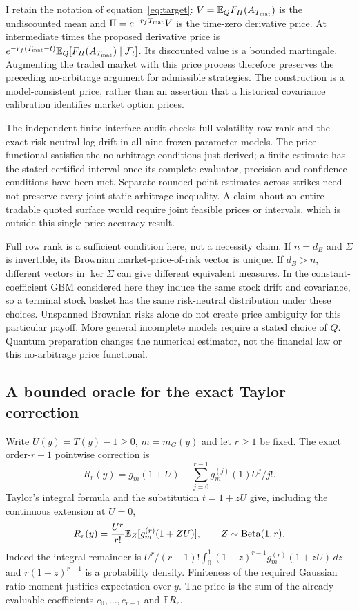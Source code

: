 I retain the notation of equation~\eqref{eq:target}:
$V=\mathbb E_Q F_H(A_{T_{\rm mat}})$ is the undiscounted mean and
$\Pi=e^{-r_fT_{\rm mat}}V$ is the time-zero derivative price.
At intermediate times the proposed derivative price is
$e^{-r_f(T_{\rm mat}-t)}\mathbb E_Q[F_H(A_{T_{\rm mat}})\mid\mathcal F_t]$.
Its discounted value is a bounded martingale. Augmenting the traded market
with this price process therefore preserves the preceding no-arbitrage
argument for admissible strategies. The construction is a model-consistent
price, rather than an assertion that a historical covariance calibration
identifies market option prices.

The independent finite-interface audit checks full volatility row rank and
the exact risk-neutral log drift in all nine frozen parameter models.
The price functional satisfies the no-arbitrage conditions just derived;
a finite estimate has the stated certified interval once its complete
evaluator, precision and confidence conditions have been met.
Separate rounded point estimates across strikes need not preserve every
joint static-arbitrage inequality. A claim about an entire tradable quoted
surface would require joint feasible prices or intervals, which is outside
this single-price accuracy result.

Full row rank is a sufficient condition here, not a necessity claim.
If $n=d_B$ and $\Sigma$ is invertible, its Brownian market-price-of-risk
vector is unique. If $d_B>n$, different vectors in $\ker\Sigma$ can give
different equivalent measures. In the constant-coefficient GBM considered
here they induce the same stock drift and covariance, so a terminal stock
basket has the same risk-neutral distribution under these choices.
Unspanned Brownian risks alone do not create price ambiguity for this
particular payoff. More general incomplete models require a stated choice
of $Q$. Quantum preparation changes the numerical estimator, not the
financial law or this no-arbitrage price functional.

\subsection{A bounded oracle for the exact Taylor correction}

Write $U(y)=T(y)-1\geq0$, $m=m_G(y)$ and let $r\geq1$ be fixed.
The exact order-$r-1$ pointwise correction is
\[
 R_r(y)=g_m(1+U)-\sum_{j=0}^{r-1}g_m^{(j)}(1)U^j/j!.
\]
Taylor's integral formula and the substitution $t=1+zU$ give, including
the continuous extension at $U=0$,
\begin{equation}
 R_r(y)={U^r\over r!}\mathbb E_Z[g_m^{(r)}(1+ZU)],\qquad
       Z\sim\operatorname{Beta}(1,r).
 \label{eq:quantum-beta-remainder}
\end{equation}
Indeed the integral remainder is
$U^r/(r-1)!\int_0^1(1-z)^{r-1}g_m^{(r)}(1+zU)\,dz$ and
$r(1-z)^{r-1}$ is a probability density. Finiteness of the required
Gaussian ratio moment justifies expectation over $y$. The price is the
sum of the already evaluable coefficients $c_0,\ldots,c_{r-1}$ and
$\mathbb E R_r$.

